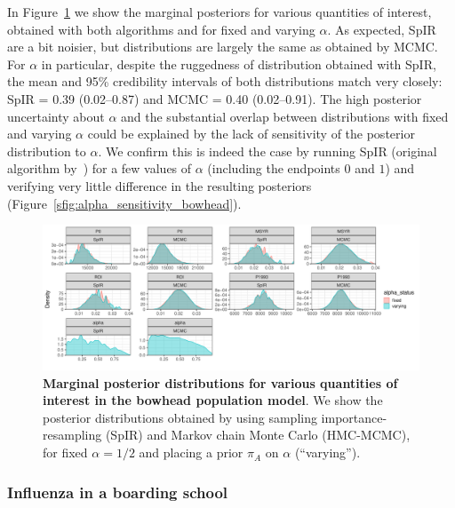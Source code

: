 \documentclass[12pt]{article}
\begin{document}
In Figure~\ref{fig:bowhead_marginal_posteriors} we show the marginal posteriors for various quantities of interest, obtained with both algorithms and for fixed and varying $\alpha$.
As expected, SpIR are a bit noisier, but distributions are largely the same as obtained by MCMC.
For $\alpha$ in particular, despite the ruggedness of distribution obtained with SpIR, the mean and 95\% credibility intervals of both distributions match very closely: SpIR = 0.39 (0.02--0.87) and MCMC = 0.40 (0.02--0.91).
The high posterior uncertainty about $\alpha$ and the substantial overlap between distributions with fixed and varying $\alpha$ could be explained by the lack of sensitivity of the posterior distribution to $\alpha$.
We confirm this is indeed the case by running SpIR (original algorithm by~\textcite{Poole2000}) for a few values of $\alpha$ (including the endpoints $0$ and $1$) and verifying very little difference in the resulting posteriors (Figure~\ref{sfig:alpha_sensitivity_bowhead}). 
\begin{figure}[!ht]
\begin{center}
\includegraphics[scale=.45]{../plots/bowhead_posteriors.pdf}
\end{center}
\caption{\textbf{Marginal posterior distributions for various quantities of interest in the bowhead population model}.
We show the posterior distributions obtained by using sampling importance-resampling (SpIR) and Markov chain Monte Carlo (HMC-MCMC), for fixed $\alpha = 1/2$ and placing a prior $\pi_A$ on $\alpha$ (``varying'').
}
\label{fig:bowhead_marginal_posteriors}
\end{figure}

\subsubsection{Influenza in a boarding school}
\label{sec:SIR_flu}
\end{document}
